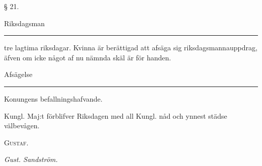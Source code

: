 \documentclass[a4paper]{article}
\renewcommand{\section}[1]{\begin{center}§ #1.\end{center}}
\begin{document}
\section{21}
Riksdagsman \rule[0.5ex]{2cm}{0.2ex} tre lagtima riksdagar.  Kvinna är
berättigad att afsäga sig riksdagsmannauppdrag, äfven om icke något af nu
nämnda skäl är för handen.

Afsägelse \rule[0.5ex]{2cm}{0.2ex} Konungens befallningshafvande.

Kungl. Maj:t förblifver Riksdagen med all Kungl. nåd och ynnest städse
välbevågen.

\vspace{2cm}
{\centering\Huge\scshape
        Gustaf.\\
}

{\raggedleft\itshape
        Gust. Sandström.\\
}

\end{document}
